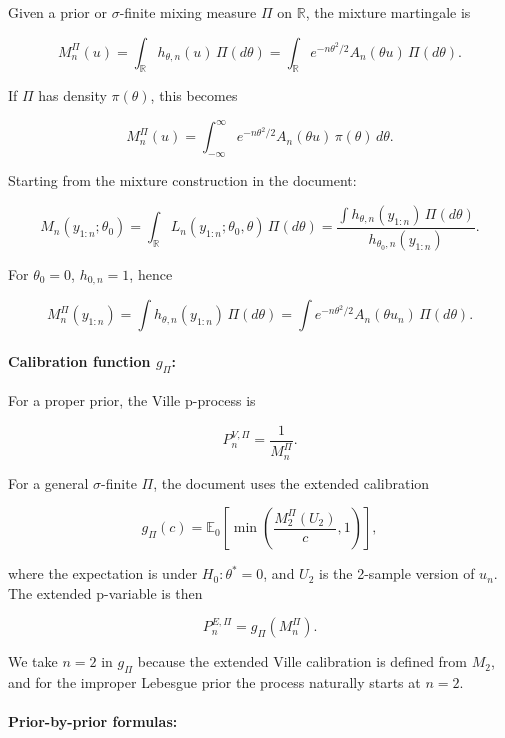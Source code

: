 \documentclass{article}%
\begin{document}
Given a prior or \(\sigma\)-finite mixing measure \(\Pi\) on \(\mathbb R\), the mixture martingale is

\[
M_n^\Pi(u)
=
\int_{\mathbb R} h_{\theta,n}(u)\,\Pi(d\theta)
=
\int_{\mathbb R} e^{-n\theta^2/2}A_n(\theta u)\,\Pi(d\theta).
\]

If \(\Pi\) has density \(\pi(\theta)\), this becomes

\[
M_n^\Pi(u)
=
\int_{-\infty}^\infty e^{-n\theta^2/2}A_n(\theta u)\,\pi(\theta)\,d\theta.
\]


Starting from the mixture construction in the document:

\[
M_n(y_{1:n};\theta_0)
=
\int_{\mathbb R}L_n(y_{1:n};\theta_0,\theta)\,\Pi(d\theta)
=
\frac{\int h_{\theta,n}(y_{1:n})\,\Pi(d\theta)}{h_{\theta_0,n}(y_{1:n})}.
\]

For \(\theta_0=0\), \(h_{0,n}=1\), hence

\[
M_n^\Pi(y_{1:n})
=
\int h_{\theta,n}(y_{1:n})\,\Pi(d\theta)
=
\int e^{-n\theta^2/2}A_n(\theta u_n)\,\Pi(d\theta).
\]


\paragraph{Calibration function \(g_\Pi\):}

For a proper prior, the Ville p-process is

\[
P_{n}^{V,\Pi}
=
\frac{1}{M_n^\Pi}.
\]

For a general \(\sigma\)-finite \(\Pi\), the document uses the extended calibration

\[
g_\Pi(c)
=
\mathbb E_0\!\left[\min\!\left(\frac{M_2^\Pi(U_2)}{c},1\right)\right],
\]

where the expectation is under \(H_0:\theta^*=0\), and \(U_2\) is the 2-sample version of \(u_n\). The extended p-variable is then

\[
P_n^{E,\Pi}
=
g_\Pi(M_n^\Pi).
\]



We take \(n=2\) in \(g_\Pi\) because the extended Ville calibration is defined from \(M_2\), and for the improper Lebesgue prior the process naturally starts at \(n=2\).



\paragraph{Prior-by-prior formulas:}
\end{document}
